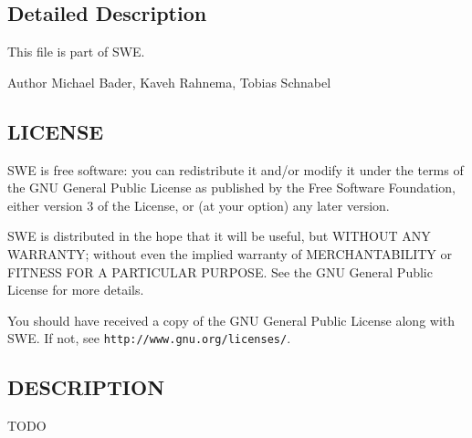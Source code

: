 \subsection{Detailed Description}
This file is part of S\-W\-E.

\begin{DoxyAuthor}{Author}
Michael Bader, Kaveh Rahnema, Tobias Schnabel
\end{DoxyAuthor}
\subsection{L\-I\-C\-E\-N\-S\-E}\label{Writer_8hh_LICENSE}
S\-W\-E is free software\-: you can redistribute it and/or modify it under the terms of the G\-N\-U General Public License as published by the Free Software Foundation, either version 3 of the License, or (at your option) any later version.

S\-W\-E is distributed in the hope that it will be useful, but W\-I\-T\-H\-O\-U\-T A\-N\-Y W\-A\-R\-R\-A\-N\-T\-Y; without even the implied warranty of M\-E\-R\-C\-H\-A\-N\-T\-A\-B\-I\-L\-I\-T\-Y or F\-I\-T\-N\-E\-S\-S F\-O\-R A P\-A\-R\-T\-I\-C\-U\-L\-A\-R P\-U\-R\-P\-O\-S\-E. See the G\-N\-U General Public License for more details.

You should have received a copy of the G\-N\-U General Public License along with S\-W\-E. If not, see {\tt http\-://www.\-gnu.\-org/licenses/}.\subsection{D\-E\-S\-C\-R\-I\-P\-T\-I\-O\-N}\label{NetCdfWriter_8hh_DESCRIPTION}
T\-O\-D\-O 